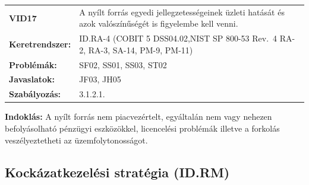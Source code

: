 \documentclass[12pt,magyar,a4paper,oneside]{scrreprt}
\begin{document}
\begin{longtable}[]{@{}ll@{}}
\toprule
\endhead
\begin{minipage}[t]{0.16\columnwidth}\raggedright
\textbf{VID17}\strut
\end{minipage} & \begin{minipage}[t]{0.79\columnwidth}\raggedright
A nyílt forrás egyedi jellegzetességeinek üzleti hatását és azok
valószínűségét is figyelembe kell venni.\strut
\end{minipage}\tabularnewline
\begin{minipage}[t]{0.16\columnwidth}\raggedright
\textbf{Keretrendszer:}\strut
\end{minipage} & \begin{minipage}[t]{0.79\columnwidth}\raggedright
ID.RA-4 (COBIT 5 DSS04.02,NIST SP 800-53 Rev.~4 RA-2, RA-3, SA-14, PM-9,
PM-11)\strut
\end{minipage}\tabularnewline
\begin{minipage}[t]{0.16\columnwidth}\raggedright
\textbf{Problémák:}\strut
\end{minipage} & \begin{minipage}[t]{0.79\columnwidth}\raggedright
SF02, SS01, SS03, ST02\strut
\end{minipage}\tabularnewline
\begin{minipage}[t]{0.16\columnwidth}\raggedright
\textbf{Javaslatok:}\strut
\end{minipage} & \begin{minipage}[t]{0.79\columnwidth}\raggedright
JF03, JH05\strut
\end{minipage}\tabularnewline
\begin{minipage}[t]{0.16\columnwidth}\raggedright
\textbf{Szabályozás:}\strut
\end{minipage} & \begin{minipage}[t]{0.79\columnwidth}\raggedright
3.1.2.1.\strut
\end{minipage}\tabularnewline
\bottomrule
\end{longtable}

\textbf{Indoklás: } A nyílt forrás nem piacvezértelt, egyáltalán nem
vagy nehezen befolyásolható pénzügyi eszközökkel, licencelési problémák
illetve a forkolás veszélyeztetheti az üzemfolytonosságot.

\hypertarget{kockuxe1zatkezeluxe9si-stratuxe9gia-id.rm}{%
\subsection{Kockázatkezelési stratégia
(ID.RM)}\label{kockuxe1zatkezeluxe9si-stratuxe9gia-id.rm}}
\end{document}
